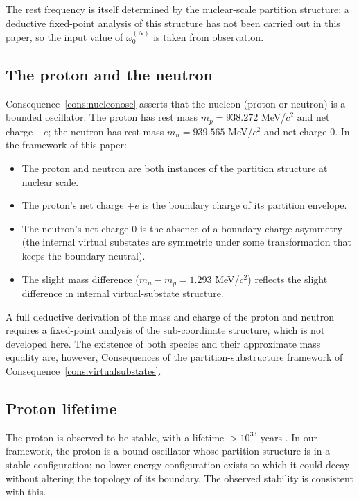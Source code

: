 \documentclass[11pt,twocolumn,a4paper]{article}
\theoremstyle{axiomstyle}
\theoremstyle{conseqstyle}
\theoremstyle{definition}
\theoremstyle{remark}
\begin{document}
The rest frequency is itself determined by the nuclear-scale partition structure; a deductive fixed-point analysis of this structure has not been carried out in this paper, so the input value of $\omega_{0}^{(N)}$ is taken from observation.

\subsection{The proton and the neutron}

Consequence~\ref{cons:nucleonosc} asserts that the nucleon (proton or neutron) is a bounded oscillator. The proton has rest mass $m_{p}=938.272$ MeV/$c^{2}$ and net charge $+e$; the neutron has rest mass $m_{n}=939.565$ MeV/$c^{2}$ and net charge $0$. In the framework of this paper:
\begin{itemize}
\item The proton and neutron are both instances of the partition structure at nuclear scale.
\item The proton's net charge $+e$ is the boundary charge of its partition envelope.
\item The neutron's net charge $0$ is the absence of a boundary charge asymmetry (the internal virtual substates are symmetric under some transformation that keeps the boundary neutral).
\item The slight mass difference ($m_{n}-m_{p}=1.293$ MeV/$c^{2}$) reflects the slight difference in internal virtual-substate structure.
\end{itemize}

A full deductive derivation of the mass and charge of the proton and neutron requires a fixed-point analysis of the sub-coordinate structure, which is not developed here. The existence of both species and their approximate mass equality are, however, Consequences of the partition-substructure framework of Consequence~\ref{cons:virtualsubstates}.

\subsection{Proton lifetime}

The proton is observed to be stable, with a lifetime $>10^{33}$ years \citep{codata2018}. In our framework, the proton is a bound oscillator whose partition structure is in a stable configuration; no lower-energy configuration exists to which it could decay without altering the topology of its boundary. The observed stability is consistent with this.
\end{document}
